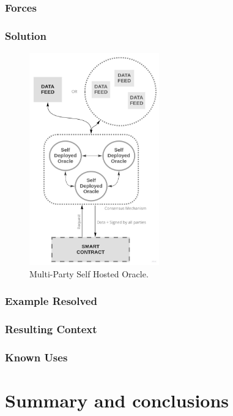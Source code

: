 \subsubsection{Forces}
\subsubsection{Solution}

\begin{figure}[t]
  \begin{center}
    \leavevmode
    \includegraphics[width=0.5\textwidth]{figures/oraclearch4.jpg}
    \caption{Multi-Party Self Hosted Oracle.}
    \label{fig:/figures/paper-screening}
  \end{center}
\end{figure}

\subsubsection{Example Resolved}
\subsubsection{Resulting Context}
\subsubsection{Known Uses}





\section{Summary and conclusions}
